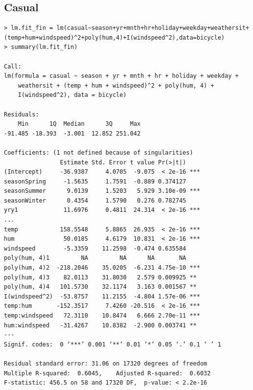\subsection{Casual}
\begin{lstlisting}[style = rlanguage]
> lm.fit_fin = lm(casual~season+yr+mnth+hr+holiday+weekday+weathersit+(temp+hum+windspeed)^2+poly(hum,4)+I(windspeed^2),data=bicycle)
> summary(lm.fit_fin)

Call:
lm(formula = casual ~ season + yr + mnth + hr + holiday + weekday +
    weathersit + (temp + hum + windspeed)^2 + poly(hum, 4) +
    I(windspeed^2), data = bicycle)

Residuals:
    Min      1Q  Median      3Q     Max
-91.485 -18.393  -3.001  12.852 251.042

Coefficients: (1 not defined because of singularities)
                Estimate Std. Error t value Pr(>|t|)
(Intercept)     -36.9387     4.0705  -9.075  < 2e-16 ***
seasonSpring     -1.5635     1.7591  -0.889 0.374127
seasonSummer      9.0139     1.5203   5.929 3.10e-09 ***
seasonWinter      0.4354     1.5790   0.276 0.782745
yry1             11.6976     0.4811  24.314  < 2e-16 ***
...
temp            158.5548     5.8865  26.935  < 2e-16 ***
hum              50.0185     4.6179  10.831  < 2e-16 ***
windspeed        -5.3359    11.2598  -0.474 0.635584
poly(hum, 4)1         NA         NA      NA       NA
poly(hum, 4)2  -218.2046    35.0205  -6.231 4.75e-10 ***
poly(hum, 4)3    82.0113    31.8030   2.579 0.009925 **
poly(hum, 4)4   101.5730    32.1174   3.163 0.001567 **
I(windspeed^2)  -53.8757    11.2155  -4.804 1.57e-06 ***
temp:hum       -152.3517     7.4260 -20.516  < 2e-16 ***
temp:windspeed   72.3110    10.8474   6.666 2.70e-11 ***
hum:windspeed   -31.4267    10.8382  -2.900 0.003741 **
---
Signif. codes:  0 ‘***’ 0.001 ‘**’ 0.01 ‘*’ 0.05 ‘.’ 0.1 ‘ ’ 1

Residual standard error: 31.06 on 17320 degrees of freedom
Multiple R-squared:  0.6045,	Adjusted R-squared:  0.6032
F-statistic: 456.5 on 58 and 17320 DF,  p-value: < 2.2e-16
\end{lstlisting}

